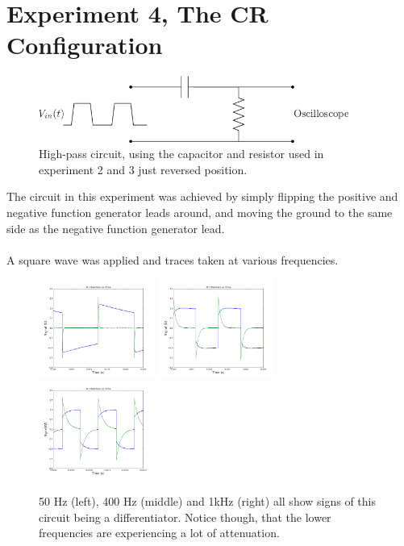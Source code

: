 \documentclass[a4paper,12pt]{article}
\begin{document}
\section*{Experiment 4, The CR Configuration}
\begin{figure}[h]
\centering
\includegraphics[width=4in]{sam_lab2/4_circuit.png}
\caption{High-pass circuit, using the capacitor and resistor used in experiment 2 and 3 just reversed position.}
\end{figure}
\noindent
The circuit in this experiment was achieved by simply flipping the positive and negative function generator leads around, and moving the ground to the same side as the negative function generator lead.
\\
\\
\newpage
\noindent
A square wave was applied and traces taken at various frequencies.
\begin{figure}[h]
\centering
\includegraphics[width=1.5in]{sam_lab2/4b_50Hz.png}
\includegraphics[width=1.5in]{sam_lab2/4b_400Hz.png}
\includegraphics[width=1.5in]{sam_lab2/4b_1kHz.png}
\caption{50 Hz (left), 400 Hz (middle) and 1kHz (right) all show signs of this circuit being a differentiator.  Notice though, that the lower frequencies are experiencing a lot of attenuation.}
\end{figure}\\
\end{document}
